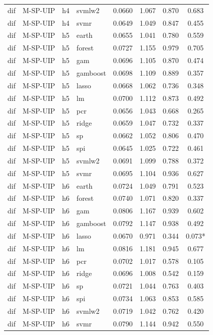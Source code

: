 \begin{ThreePartTable}
\begin{longtable}[t]{llclcccc}
dif & M-SP-UIP & h4 & svmlw2 & 0.0660 & 1.067 & 0.870 & 0.683\\
dif & M-SP-UIP & h4 & svmr & 0.0649 & 1.049 & 0.847 & 0.455\\
\addlinespace
dif & M-SP-UIP & h5 & earth & 0.0655 & 1.041 & 0.780 & 0.559\\
dif & M-SP-UIP & h5 & forest & 0.0727 & 1.155 & 0.979 & 0.705\\
dif & M-SP-UIP & h5 & gam & 0.0696 & 1.105 & 0.870 & 0.474\\
dif & M-SP-UIP & h5 & gamboost & 0.0698 & 1.109 & 0.889 & 0.357\\
dif & M-SP-UIP & h5 & lasso & 0.0668 & 1.062 & 0.736 & 0.348\\
dif & M-SP-UIP & h5 & lm & 0.0700 & 1.112 & 0.873 & 0.492\\
dif & M-SP-UIP & h5 & pcr & 0.0656 & 1.043 & 0.668 & 0.265\\
dif & M-SP-UIP & h5 & ridge & 0.0659 & 1.047 & 0.732 & 0.337\\
dif & M-SP-UIP & h5 & sp & 0.0662 & 1.052 & 0.806 & 0.470\\
dif & M-SP-UIP & h5 & spi & 0.0645 & 1.025 & 0.722 & 0.461\\
dif & M-SP-UIP & h5 & svmlw2 & 0.0691 & 1.099 & 0.788 & 0.372\\
dif & M-SP-UIP & h5 & svmr & 0.0695 & 1.104 & 0.936 & 0.627\\
\addlinespace
dif & M-SP-UIP & h6 & earth & 0.0724 & 1.049 & 0.791 & 0.523\\
dif & M-SP-UIP & h6 & forest & 0.0740 & 1.071 & 0.820 & 0.337\\
dif & M-SP-UIP & h6 & gam & 0.0806 & 1.167 & 0.939 & 0.602\\
dif & M-SP-UIP & h6 & gamboost & 0.0792 & 1.147 & 0.938 & 0.492\\
dif & M-SP-UIP & h6 & lasso & 0.0670 & 0.971 & 0.344 & 0.073*\\
dif & M-SP-UIP & h6 & lm & 0.0816 & 1.181 & 0.945 & 0.677\\
dif & M-SP-UIP & h6 & pcr & 0.0702 & 1.017 & 0.578 & 0.105\\
dif & M-SP-UIP & h6 & ridge & 0.0696 & 1.008 & 0.542 & 0.159\\
dif & M-SP-UIP & h6 & sp & 0.0721 & 1.044 & 0.763 & 0.403\\
dif & M-SP-UIP & h6 & spi & 0.0734 & 1.063 & 0.853 & 0.585\\
dif & M-SP-UIP & h6 & svmlw2 & 0.0719 & 1.042 & 0.762 & 0.420\\
dif & M-SP-UIP & h6 & svmr & 0.0790 & 1.144 & 0.942 & 0.550\\

\end{longtable}
\end{ThreePartTable}
